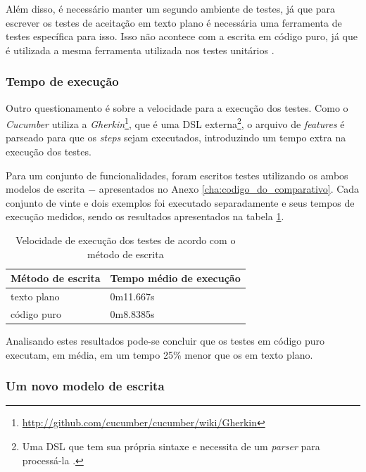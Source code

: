 Além disso, é necessário manter um segundo ambiente de testes, já que para escrever os testes de aceitação em texto plano é necessária uma ferramenta de testes específica para isso. Isso não acontece com a escrita em código puro, já que é utilizada a mesma ferramenta utilizada nos testes unitários \cite{WhyBotherWithCucumberTesting}.


\subsubsection{Tempo de execução} %
\label{subsub:tempo_de_execucao}

Outro questionamento é sobre a velocidade para a execução dos testes. Como o \textit{Cucumber} utiliza a \textit{Gherkin}\footnote{\url{http://github.com/cucumber/cucumber/wiki/Gherkin}}, que é uma DSL externa\footnote{Uma DSL que tem sua própria sintaxe e necessita de um \textit{parser} para processá-la \cite{DSLFowler}.}, o arquivo de \textit{features} é parseado para que os \textit{steps} sejam executados, introduzindo um tempo extra na execução dos testes.

Para um conjunto de funcionalidades, foram escritos testes utilizando os ambos modelos de escrita $-$ apresentados no Anexo \ref{cha:codigo_do_comparativo}. Cada conjunto de vinte e dois exemplos foi executado separadamente e seus tempos de execução medidos, sendo os resultados apresentados na tabela \ref{table:tempo_de_execucao}.

\begin{table}[ht]
\caption{Velocidade de execução dos testes de acordo com o método de escrita}
\label{table:tempo_de_execucao}
\centering
\begin{tabular}{p{4.5cm} p{6.5cm}}
\toprule
\textbf{Método de escrita} & \textbf{Tempo médio de execução} \\
\midrule[1pt]
texto plano & 0m11.667s \\ \midrule
código puro & 0m8.8385s \\
\bottomrule
\end{tabular}
\end{table}

Analisando estes resultados pode-se concluir que os testes em código puro executam, em média, em um tempo 25\% menor que os em texto plano.


\subsubsection{Um novo modelo de escrita} %
\label{ssub:um_novo_modelo_de_escrita}

